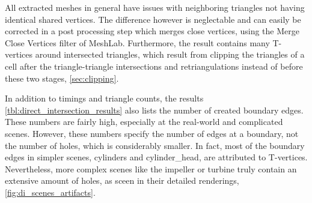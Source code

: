 All extracted meshes in general have issues with neighboring triangles not having identical shared vertices.
The difference however is neglectable and can easily be corrected in a post processing step which merges close vertices, \eg using the Merge Close Vertices filter of MeshLab.
Furthermore, the result contains many T-vertices around intersected triangles, which result from clipping the triangles of a cell after the triangle-triangle intersections and retriangulations instead of before these two stages, \cf \cref{sec:clipping}.

In addition to timings and triangle counts, the results \cref{tbl:direct_intersection_results} also lists the number of created boundary edges.
These numbers are fairly high, especially at the real-world and complicated scenes.
However, these numbers specify the number of edges at a boundary, not the number of holes, which is considerably smaller.
In fact, most of the boundary edges in simpler scenes, \eg cylinders and cylinder\_head, are attributed to T-vertices.
Nevertheless, more complex scenes like the impeller or turbine truly contain an extensive amount of holes, as sceen in their detailed renderings, \cf \cref{fig:di_scenes_artifacts}.

